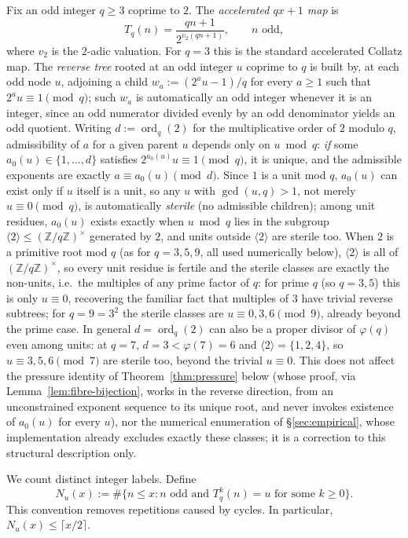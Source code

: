 \documentclass[11pt]{article}
\theoremstyle{remark}
\DeclareMathOperator{\ord}{ord}
\begin{document}
Fix an odd integer $q\ge 3$ coprime to $2$. The \emph{accelerated
$qx+1$ map} is
\[
  T_q(n) = \frac{qn+1}{2^{v_2(qn+1)}}, \qquad n \text{ odd},
\]
where $v_2$ is the $2$-adic valuation. For $q=3$ this is the standard
accelerated Collatz map. The \emph{reverse tree} rooted at an odd
integer $u$ coprime to $q$ is built by, at each odd node $u$, adjoining
a child $w_a := (2^a u - 1)/q$ for every $a\ge 1$ such that
$2^a u \equiv 1 \pmod q$; such $w_a$ is automatically an odd integer
whenever it is an integer, since an odd numerator divided evenly by an
odd denominator yields an odd quotient. Writing $d:=\ord_q(2)$ for the
multiplicative order of $2$ modulo $q$, admissibility of $a$ for a
given parent $u$ depends only on $u\bmod q$: \emph{if} some
$a_0(u)\in\{1,\dots,d\}$ satisfies $2^{a_0(u)}u\equiv 1\pmod q$, it is
unique, and the admissible exponents are exactly $a\equiv a_0(u)\pmod
d$. Since $1$ is a unit mod $q$, $a_0(u)$ can exist only if $u$ itself
is a unit, so any $u$ with $\gcd(u,q)>1$, not merely $u\equiv 0\pmod
q$, is automatically \emph{sterile} (no admissible children); among
unit residues, $a_0(u)$ exists exactly when $u\bmod q$ lies in the
subgroup $\langle2\rangle\le(\mathbb{Z}/q\mathbb{Z})^\times$ generated
by $2$, and units outside $\langle2\rangle$ are sterile too. When $2$
is a primitive root mod $q$ (as for $q=3,5,9$, all used numerically
below), $\langle2\rangle$ is all of $(\mathbb{Z}/q\mathbb{Z})^\times$,
so every unit residue is fertile and the sterile classes are exactly
the non-units, i.e.\ the multiples of any prime factor of $q$: for
prime $q$ (so $q=3,5$) this is only $u\equiv0$, recovering the
familiar fact that multiples of $3$ have trivial reverse subtrees; for
$q=9=3^2$ the sterile classes are $u\equiv0,3,6\pmod9$, already beyond
the prime case. In general $d=\ord_q(2)$ can also be a proper divisor of
$\varphi(q)$ even among units: at $q=7$, $d=3<\varphi(7)=6$ and
$\langle2\rangle=\{1,2,4\}$, so $u\equiv 3,5,6\pmod7$ are sterile too,
beyond the trivial $u\equiv 0$. This does not
affect the pressure identity of Theorem~\ref{thm:pressure} below (whose
proof, via Lemma~\ref{lem:fibre-bijection}, works in the reverse
direction, from an unconstrained exponent sequence to its unique
root, and never invokes existence of $a_0(u)$ for every $u$), nor
the numerical enumeration of \S\ref{sec:empirical}, whose
implementation already excludes exactly these classes; it is a
correction to this structural description only.

We count distinct integer labels. Define
\[
 N_u(x):=\#\{n\le x:n\text{ odd and }T_q^k(n)=u
                    \text{ for some }k\ge0\}.
\]
This convention removes repetitions caused by cycles. In particular,
$N_u(x)\le\lceil x/2\rceil$.
\end{document}
